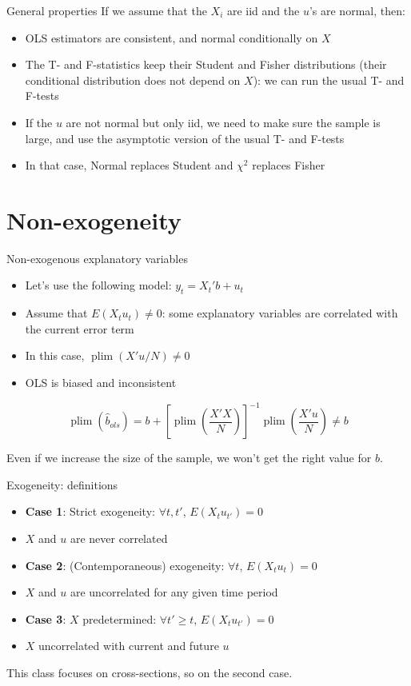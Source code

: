 \documentclass[aspectratio=169]{beamer}
\DeclareMathOperator{\plim}{plim}
\begin{document}
\begin{frame}{General properties}
If we assume that the $X_i$ are iid and the $u$'s are normal, then:
\begin{itemize}
    \item OLS estimators are consistent, and normal conditionally on $X$
    \item The T- and F-statistics keep their Student and Fisher distributions (their conditional distribution does not depend on $X$): we can run the usual T- and F-tests
    \item If the $u$ are not normal but only iid, we need to make sure the sample is large, and use the asymptotic version of the usual T- and F-tests
    \item In that case, Normal replaces Student and $\chi^2$ replaces Fisher
\end{itemize}
\end{frame}

\section{Non-exogeneity}

\begin{frame}{Non-exogenous explanatory variables}
\begin{itemize}
    \item Let's use the following model: $y_t = X_t'b + u_t$
    \item Assume that $E(X_tu_t) \neq 0$: some explanatory variables are correlated with the current error term
    \item In this case, $\plim(X'u/N) \neq 0$
    \item OLS is biased and inconsistent
\end{itemize}

\[\plim(\hat{b}_{ols}) = b + \left[\plim\left(\frac{X'X}{N}\right)\right]^{-1}\plim\left(\frac{X'u}{N}\right) \neq b\]

Even if we increase the size of the sample, we won't get the right value for $b$.
\end{frame}

\begin{frame}{Exogeneity: definitions}
\begin{itemize}
    \item \textbf{Case 1}: Strict exogeneity: $\forall t, t'$, $E(X_tu_{t'}) = 0$
    \item $X$ and $u$ are never correlated
    \item \textbf{Case 2}: (Contemporaneous) exogeneity: $\forall t$, $E(X_tu_t) = 0$
    \item $X$ and $u$ are uncorrelated for any given time period
    \item \textbf{Case 3}: $X$ predetermined: $\forall t' \geq t$, $E(X_tu_{t'}) = 0$
    \item $X$ uncorrelated with current and future $u$
\end{itemize}

This class focuses on cross-sections, so on the second case.
\end{frame}
\end{document}
